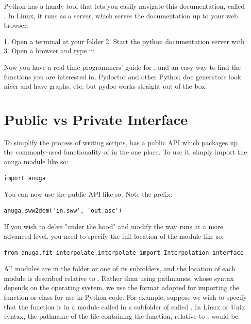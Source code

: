 \documentclass{manual}
\begin{document}
Python has a handy tool that lets you easily navigate this documentation,
called . In Linux, it runs as a server, which serves the
documentation up to your web browser:

1. Open a terminal at your  folder
2. Start the python documentation server with 
3. Open a browser and type in 

Now you have a real-time programmers' guide for \anuga, and an easy way to find 
the functions you are interested in. Pydoctor and other Python doc generators
look nicer and have graphs, etc, but pydoc works straight out of the box. 

\section{Public vs Private Interface}

To simplify the process of writing scripts, \anuga has a public API which packages
up the commonly-used functionality of \anuga in the one place. To use it, simply
import the anuga module like so:

\begin{verbatim}
import anuga
\end{verbatim}

You can now use the public API like so. Note the  prefix:

\begin{verbatim}
anuga.sww2dem('in.sww', 'out.asc')
\end{verbatim}

If you wish to delve "under the hood" and modify the way \anuga runs at a more
advanced level, you need to specify the full location of the module like so:

\begin{verbatim}
from anuga.fit_interpolate.interpolate import Interpolation_interface
\end{verbatim}

All modules are in the folder  or one of its subfolders, and the
location of each module is described relative to . Rather
than using pathnames, whose syntax depends on the operating system,
we use the format adopted for importing the function or class for
use in Python code. For example, suppose we wish to specify that the
function  is in a module called
 in a subfolder of  called
. In Linux or Unix syntax, the pathname of the file
containing the function, relative to , would be:
\end{document}
